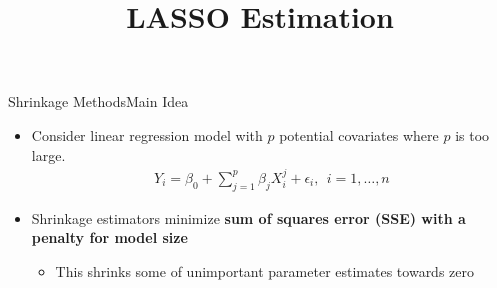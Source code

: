 \documentclass[dvipsnames,hyperref={pdfpagelabels=false}]{beamer}
\begin{document}
	
	



\title[]  
{LASSO Estimation}


\author 
{}

\institute{}






\date
{}


\begin{frame}{}
	\titlepage
\end{frame}




	
	
	\begin{frame}{Shrinkage Methods}{Main Idea}
		\begin{itemize}
			\item Consider linear regression model with $p$ potential covariates where $p$ is too large.
			\vspace{0.2cm}
			\begin{eqnarray*}
				Y_{i} = \beta_{0} + \sum^{p}_{j=1} \beta_{j} X^{j}_{i}  + \epsilon_{i}, 
				 \ \ i=1, \ldots ,n
			\end{eqnarray*}		
			\vspace{0.2cm}
			\item Shrinkage estimators minimize \textbf{sum of squares error (SSE) with a penalty for model size} 
			\vspace{0.2cm} 
			\begin{itemize}
				\item This shrinks some of unimportant parameter estimates towards zero 
			\end{itemize}
			\vspace{0.2cm} 
			
		\end{itemize}
	\end{frame}
	
\end{document}
